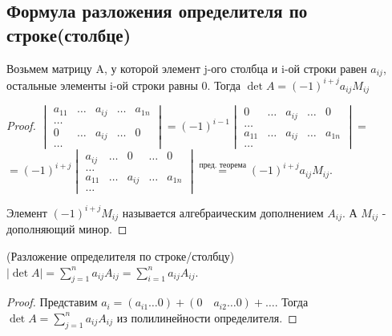 \subsection{Формула разложения определителя по строке(столбце)}
\begin{proposition}
	Возьмем матрицу A, у которой элемент j-ого столбца и i-ой строки равен \(a_{ij}\), остальные элементы i-ой строки равны 0. Тогда \(\det A = (-1)^{i+j}a_{ij}M_{ij}\)
\end{proposition}
\begin{proof}
	\(\begin{vmatrix}
		a_{11} & \ldots & a_{ij} & \ldots & a_{1n} \\
		\ldots \\
		0 & \ldots & a_{ij} & \ldots & 0 \\
		\ldots
	\end{vmatrix} = (-1)^{i-1}\begin{vmatrix}
	
	0 & \ldots & a_{ij} & \ldots & 0 \\
	\ldots \\
	
	a_{11} & \ldots & a_{ij} & \ldots & a_{1n} \\
	\ldots
	\end{vmatrix} = \) \newline \( = (-1)^{i+j}\begin{vmatrix}
	
	a_{ij} & \ldots & 0 &\ldots & 0 \\
	\ldots \\
	
	a_{11} & \ldots & a_{ij} & \ldots & a_{1n} \\
	\ldots
	\end{vmatrix}\overset{\text{пред. теорема}}{=}(-1)^{i+j}a_{ij}M_{ij}\). 
	
	Элемент \((-1)^{i+j}M_{ij}\) называется алгебраическим дополнением \(A_{ij}\). А \(M_{ij}\) - дополняющий минор.
\end{proof}
\begin{theorem}
	(Разложение определителя по строке/столбцу) \newline
	\(|\det A| = \sum_{j=1}^{n}a_{ij}A_{ij} = \sum_{i=1}^{n}a_{ij}A_{ij}\).
\end{theorem}
\begin{proof}
	Представим \(a_i = (a_{i1} \ldots 0) + (0 \quad a_{i2} \ldots 0) + \ldots \). Тогда \(\det A = \sum_{j=1}^{n}a_{ij}A_{ij}\) из полилинейности определителя.
\end{proof}
